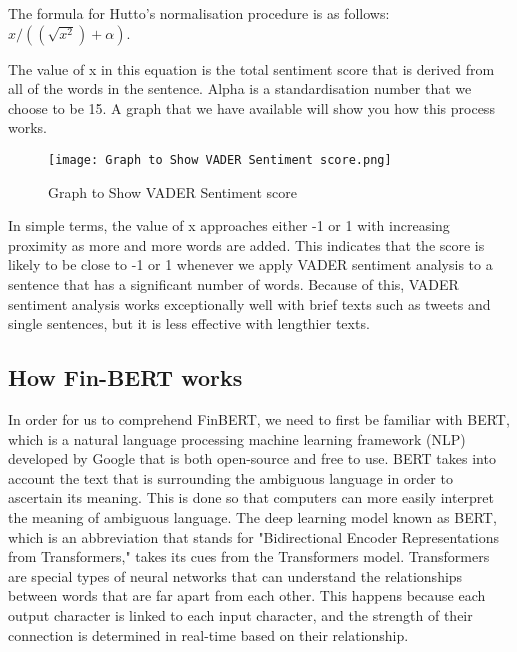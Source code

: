 \documentclass[12pt, a4paper,twoside]{report}
\theoremstyle{plain} %
\theoremstyle{definition} %
\theoremstyle{remark} %
\numberwithin{equation}{chapter}
\begin{document}
The formula for Hutto's normalisation procedure is as follows: $x/((\sqrt{x^2})+\alpha)$.  \cite{VADER2017}


The value of x in this equation is the total sentiment score that is derived from all of the words in the sentence. Alpha is a standardisation number that we choose to be 15. A graph that we have available will show you how this process works.

\begin{figure}
    \centering
    \texttt{[image: Graph to Show VADER Sentiment score.png]}
    \caption{Graph to Show VADER Sentiment score} \cite{VADER2017}
    \label{fig:vader}
\end{figure}

In simple terms, the value of x approaches either -1 or 1 with increasing proximity as more and more words are added. This indicates that the score is likely to be close to -1 or 1 whenever we apply VADER sentiment analysis to a sentence that has a significant number of words. Because of this, VADER sentiment analysis works exceptionally well with brief texts such as tweets and single sentences, but it is less effective with lengthier texts.




    \subsection{How Fin-BERT works}

    In order for us to comprehend FinBERT, we need to first be familiar with BERT, which is a natural language processing machine learning framework (NLP) developed by Google that is both open-source and free to use. BERT takes into account the text that is surrounding the ambiguous language in order to ascertain its meaning. This is done so that computers can more easily interpret the meaning of ambiguous language. The deep learning model known as BERT, which is an abbreviation that stands for "Bidirectional Encoder Representations from Transformers," takes its cues from the Transformers model. Transformers are special types of neural networks that can understand the relationships between words that are far apart from each other. This happens because each output character is linked to each input character, and the strength of their connection is determined in real-time based on their relationship.  
    
\end{document}
